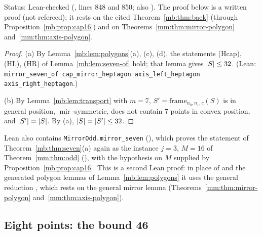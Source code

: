 Status: Lean-checked (, lines 848 and 850; also ).
The proof below is a written proof (not refereed); it rests on the cited Theorem~\ref{mb:thm:baek} (through
Proposition~\ref{mb:prop:cap16}) and on Theorems~\ref{mm:thm:mirror-polygon} and~\ref{mm:thm:axis-polygon}.

\begin{proof}
(a) By Lemma~\ref{mb:lem:polygons}(a), (c), (d), the statements (Hcap), (HL), (HR) of Lemma~\ref{mb:lem:seven-of} hold;
that lemma gives $\lvert S\rvert\le32$. (Lean: \texttt{mirror\_seven\_of cap\_mirror\_heptagon axis\_left\_heptagon
axis\_right\_heptagon}.)

(b) By Lemma~\ref{mb:lem:transport} with $m=7$, $S'=\mathrm{frame}_{n_0,n_1,c}(S)$ is in general position,
$\operatorname{mir}$-symmetric, does not contain $7$ points in convex position, and $\lvert S'\rvert=\lvert S\rvert$. By (a),
$\lvert S\rvert=\lvert S'\rvert\le32$.
\end{proof}

\begin{remark}\label{mb:rem:seven}
Lean also contains \texttt{MirrorOdd.}\allowbreak\texttt{mirror\_seven\textquotesingle} (),
which proves the statement of Theorem~\ref{mb:thm:seven}(a) again as the instance $j=3$, $M=16$ of
Theorem~\ref{mm:thm:odd} (), with the hypothesis on $M$ supplied by
Proposition~\ref{mb:prop:cap16}. This is a second Lean proof: in place of  and the generated
polygon lemmas of Lemma~\ref{mb:lem:polygons} it uses the general reduction , which rests on
the general mirror lemma (Theorems~\ref{mm:thm:mirror-polygon} and~\ref{mm:thm:axis-polygon}).
\end{remark}

\subsection{Eight points: the bound 46}\label{mb:ssec:eight}

